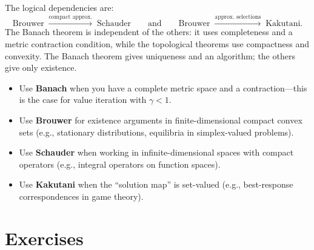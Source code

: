 \documentclass[11pt,a4paper]{article}
\begin{document}
\begin{remark}
\label{rem:hierarchy}
The logical dependencies are:
\[
    \text{Brouwer} \;\xrightarrow{\text{compact approx.}}\;
    \text{Schauder}
    \qquad \text{and} \qquad
    \text{Brouwer} \;\xrightarrow{\text{approx.\ selections}}\;
    \text{Kakutani}.
\]
The Banach theorem is independent of the others: it uses completeness
and a metric contraction condition, while the topological theorems
use compactness and convexity.  The Banach theorem gives uniqueness
and an algorithm; the others give only existence.
\end{remark}

\begin{warning}[title={Choosing the Right Theorem}]
\begin{itemize}[nosep]
    \item Use \textbf{Banach} when you have a complete metric space
          and a contraction---this is the case for value iteration
          with $\gamma < 1$.
    \item Use \textbf{Brouwer} for existence arguments in
          finite-dimensional compact convex sets (e.g., stationary
          distributions, equilibria in simplex-valued problems).
    \item Use \textbf{Schauder} when working in infinite-dimensional
          spaces with compact operators (e.g., integral operators on
          function spaces).
    \item Use \textbf{Kakutani} when the ``solution map'' is
          set-valued (e.g., best-response correspondences in game
          theory).
\end{itemize}
\end{warning}


\section{Exercises}
\label{sec:exercises}
\end{document}
